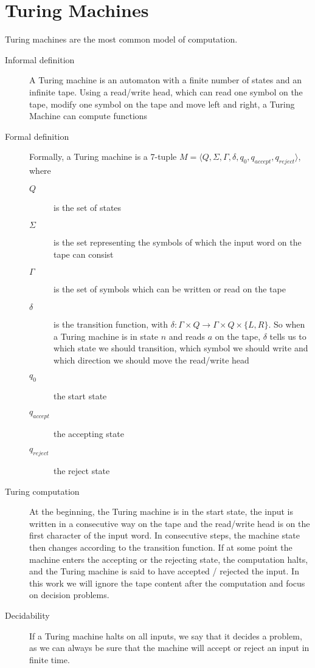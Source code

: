 \section{Turing Machines}\label{sec:turing-machines}
Turing machines are the most common model of computation.
\begin{description}
    \item[Informal definition] A Turing machine is an automaton with a finite number of states and an infinite tape. Using a read/write head, which can read one symbol on the tape, modify one symbol on the tape and move left and right, a Turing Machine can compute functions
    \item[Formal definition] Formally, a Turing machine is a 7-tuple $M = \langle  Q, \Sigma, \Gamma, \delta, q_0, q_{accept}, q_{reject}\rangle$, where
    \begin{description}
        \item[$Q$] is the set of states
        \item[$\Sigma$] is the set representing the symbols of which the input word on the tape can consist
        \item[$\Gamma$] is the set of symbols which can be written or read on the tape
        \item[$\delta$] is the transition function, with $\delta : \Gamma \times Q \to \Gamma \times Q \times \{L, R\}$.
        So when a Turing machine is in state $n$ and reads $a$ on the tape, $\delta$ tells us to which state we should transition, which symbol we should write and which direction we should move the read/write head
        \item[$q_0$] the start state
        \item[$q_{accept}$] the accepting state
        \item[$q_{reject}$] the reject state
    \end{description}
    \item[Turing computation] At the beginning, the Turing machine is in the start state, the input is written in a consecutive way on the tape and the read/write head is on the first character of the input word.
    In consecutive steps, the machine state then changes according to the transition function.
    If at some point the machine enters the accepting or the rejecting state, the computation halts, and the Turing machine is said to have accepted / rejected the input.
    In this work we will ignore the tape content after the computation and focus on decision problems.
    \item[Decidability] If a Turing machine halts on all inputs, we say that it decides a problem, as we can always be sure that the machine will accept or reject an input in finite time.

\end{description}
